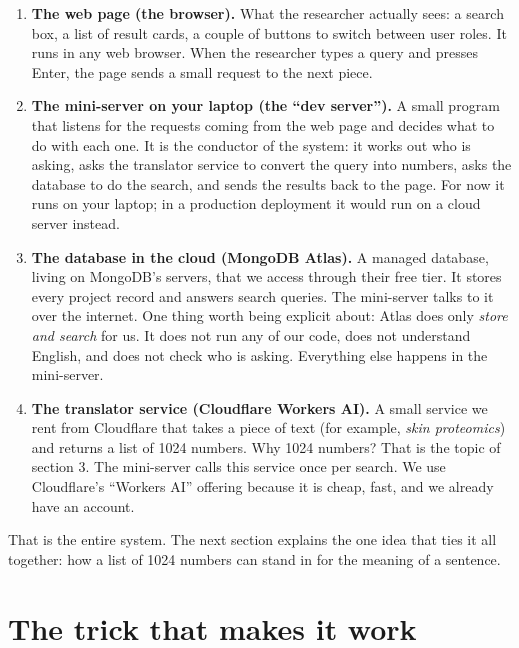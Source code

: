 \documentclass[11pt,a4paper]{article}
\begin{document}
\medskip

\begin{enumerate}[leftmargin=2em,itemsep=8pt]
  \item \textbf{The web page (the browser).} What the researcher actually sees: a search box, a list of result cards, a couple of buttons to switch between user roles. It runs in any web browser. When the researcher types a query and presses Enter, the page sends a small request to the next piece.

  \item \textbf{The mini-server on your laptop (the ``dev server'').} A small program that listens for the requests coming from the web page and decides what to do with each one. It is the conductor of the system: it works out who is asking, asks the translator service to convert the query into numbers, asks the database to do the search, and sends the results back to the page. For now it runs on your laptop; in a production deployment it would run on a cloud server instead.

  \item \textbf{The database in the cloud (MongoDB Atlas).} A managed database, living on MongoDB's servers, that we access through their free tier. It stores every project record and answers search queries. The mini-server talks to it over the internet. One thing worth being explicit about: Atlas does only \emph{store and search} for us. It does not run any of our code, does not understand English, and does not check who is asking. Everything else happens in the mini-server.

  \item \textbf{The translator service (Cloudflare Workers AI).} A small service we rent from Cloudflare that takes a piece of text (for example, \emph{skin proteomics}) and returns a list of 1024 numbers. Why 1024 numbers? That is the topic of section 3. The mini-server calls this service once per search. We use Cloudflare's ``Workers AI'' offering because it is cheap, fast, and we already have an account.
\end{enumerate}

That is the entire system. The next section explains the one idea that ties it all together: how a list of 1024 numbers can stand in for the meaning of a sentence.

\section{The trick that makes it work}
\end{document}
